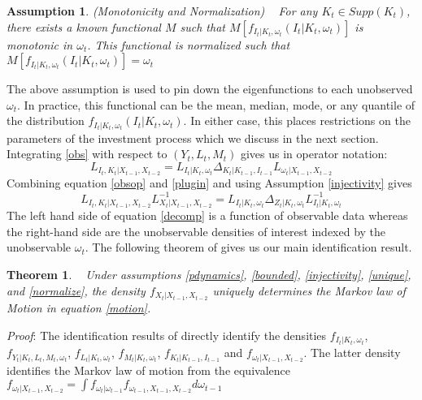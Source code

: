 \documentclass{article}
\newtheorem{assump}{Assumption}[section]
\newtheorem{theorem}{Theorem}[section]
\begin{document}
\begin{assump} (Monotonicity and Normalization) \label{normalize}
~
For any $K_{t}\in Supp(K_{t})$, there exists a known functional $M$ such that $M[f_{I_{t}|K_{t}, \omega_{t}}(I_{t}|K_{t}, \omega_{t})]$ is monotonic in $\omega_{t}$. This functional is normalized such that $M[f_{I_{t}|K_{t}, \omega_{t}}(I_{t}|K_{t}, \omega_{t})]=\omega_{t}$
\end{assump}
The above assumption is used to pin down the eigenfunctions to each unobserved $\omega_{t}$. In practice, this functional can be the mean, median, mode, or any quantile of the distribution $f_{I_{t}|K_{t}, \omega_{t}}(I_{t}|K_{t}, \omega_{t})$. In either case, this places restrictions on the parameters of the investment process which we discuss in the next section.\\

Integrating \eqref{obs} with respect to $(Y_{t}, L_{t}, M_{t})$ gives us in operator notation:
\begin{equation} \label{plugin}
L_{I_{t}, K_{t}|X_{t-1}, X_{t-2}}=L_{I_{t}|K_{t}, \omega_{t}}\Delta_{K_{t}|K_{t-1}, I_{t-1}}L_{\omega_{t}|X_{t-1}, X_{t-2}}
\end{equation}
Combining equation \eqref{obsop} and \eqref{plugin} and using Assumption \eqref{injectivity} gives
\begin{equation} \label{decomp}
L_{I_{t}, K_{t}|X_{t-1}, X_{t-2}}L^{-1}_{X_{t}|X_{t-1}, X_{t-2}}=L_{I_{t}|K_{t}, \omega_{t}}\Delta_{Z_{t}|K_{t}, \omega_{t}}L^{-1}_{I_{t}|K_{t}, \omega_{t}}
\end{equation}
The left hand side of equation \eqref{decomp} is a function of observable data whereas the right-hand side are the unobservable densities of interest indexed by the unobservable $\omega_{t}$. The following theorem of \cite{Hu2008} gives us our main identification result.\\

\begin{theorem} \label{identification}
~
Under assumptions \eqref{pdynamics}, \eqref{bounded}, \eqref{injectivity}, \eqref{unique}, and \eqref{normalize}, the density $f_{X_{t}|X_{t-1}, X_{t-2}}$ uniquely determines the Markov law of Motion in equation \eqref{motion}.
\end{theorem}

\textit{Proof}: The identification results of \cite{Hu2008} directly identify the densities $f_{I_{t}|K_{t}, \omega_{t}}$, $f_{Y_{t}|K_{t}, L_{t}, M_{t}, \omega_{t}}$, $f_{L_{t}|K_{t}, \omega_{t}}$, $f_{M_{t}|K_{t}, \omega_{t}}$, $f_{K_{t}|K_{t-1}, I_{t-1}}$ and $f_{\omega_{t}|X_{t-1}, X_{t-2}}$. The latter density identifies the Markov law of motion from the equivalence $f_{\omega_{t}|X_{t-1}, X_{t-2}}=\int f_{\omega_{t}|\omega_{t-1}}f_{\omega_{t-1}, X_{t-1}, X_{t-2}}d\omega_{t-1}$
\end{document}

